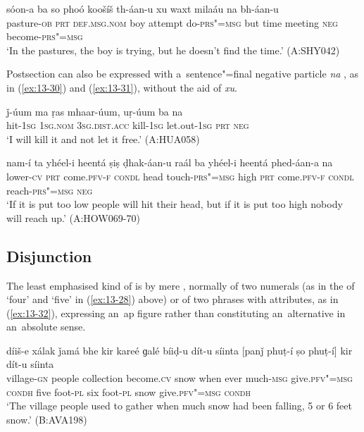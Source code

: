 \begin{exe}
\ex
\label{ex:13-29}
\gll sóon-a ba so phoó koošíš th-áan-u xu waxt milaáu na bh-áan-u \\
pasture-\textsc{ob} \textsc{prt} \textsc{def.msg.nom} boy attempt   do-\textsc{prs"=msg} but time meeting \textsc{neg} become-\textsc{prs"=msg} \\
\glt `In the pastures, the boy is trying, but he doesn't find the time.' (A:SHY042) 
\end{exe}

 Postsection can also be expressed with a~sentence"=final negative particle \textit{na} , as in (\ref{ex:13-30}) and (\ref{ex:13-31}), without the aid of \textit{xu}. 

\begin{exe}
\ex
\label{ex:13-30}
\gll ǰ-úum ma ṛas mhaar-úum, uṛ-úum ba na \\
hit-\textsc{1sg} \textsc{1sg.nom} \textsc{3sg.dist.acc} kill-\textsc{1sg} let.out-\textsc{1sg}
\textsc{prt} \textsc{neg} \\
\glt `I will kill it and not let it free.' (A:HUA058)

\ex
\label{ex:13-31}
\gll nam-í ta yhéel-i heentá ṣiṣ ḍhak-áan-u raál ba yhéel-i heentá phed-áan-a na \\
lower-\textsc{cv} \textsc{prt} come.\textsc{pfv-f} \textsc{condl} head touch-\textsc{prs"=msg}  high \textsc{prt} come.\textsc{pfv-f} \textsc{condl} reach-\textsc{prs"=msg} \textsc{neg} \\
\glt `If it is put too low people will hit their head, but if it is put too high nobody will reach up.' (A:HOW069-70)
\end{exe}

\subsection{Disjunction}
\label{subsec:13-2-3}

 The least emphasised kind of  is by mere , normally of two numerals (as in the  of `four' and `five' in (\ref{ex:13-28}) above) or of two  phrases with  attributes, as in (\ref{ex:13-32}), expressing an~ap figure rather than constituting an~alternative in an~absolute sense.

\begin{exe}
\ex
\label{ex:13-32}
\gll díiš-e xálak ǰamá bhe kir kareé ɡalé bíiḍ-u dít-u síinta [panǰ phuṭ-í ṣo phuṭ-í] kir dít-u síinta \\
village-\textsc{gn} people collection become.\textsc{cv} snow  when ever much-\textsc{msg} give.\textsc{pfv"=msg} \textsc{condh} five  foot-\textsc{pl} six foot-\textsc{pl} snow give.\textsc{pfv"=msg} \textsc{condh}  \\
\glt `The village people used to gather when much snow had been falling, 5 or 6 feet snow.' (B:AVA198) 
\end{exe}

